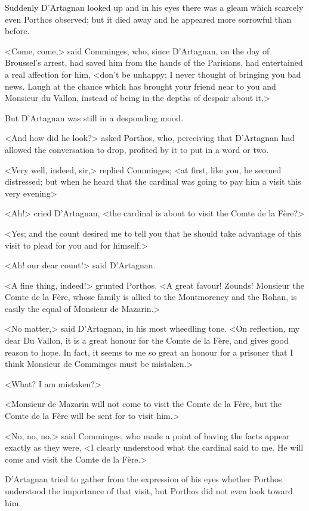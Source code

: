 Suddenly D'Artagnan looked up and in his eyes there was a gleam which scarcely even Porthos observed; but it died away and he appeared more sorrowful than before.

<Come, come,> said Comminges, who, since D'Artagnan, on the day of Broussel's arrest, had saved him from the hands of the Parisians, had entertained a real affection for him, <don't be unhappy; I never thought of bringing you bad news. Laugh at the chance which has brought your friend near to you and Monsieur du Vallon, instead of being in the depths of despair about it.>

But D'Artagnan was still in a desponding mood.

<And how did he look?> asked Porthos, who, perceiving that D'Artagnan had allowed the conversation to drop, profited by it to put in a word or two.

<Very well, indeed, sir,> replied Comminges; <at first, like you, he seemed distressed; but when he heard that the cardinal was going to pay him a visit this very evening\longdash>

<Ah!> cried D'Artagnan, <the cardinal is about to visit the Comte de la Fère?>

<Yes; and the count desired me to tell you that he should take advantage of this visit to plead for you and for himself.>

<Ah! our dear count!> said D'Artagnan.

<A fine thing, indeed!> grunted Porthos. <A great favour! Zounds! Monsieur the Comte de la Fère, whose family is allied to the Montmorency and the Rohan, is easily the equal of Monsieur de Mazarin.>

<No matter,> said D'Artagnan, in his most wheedling tone. <On reflection, my dear Du Vallon, it is a great honour for the Comte de la Fère, and gives good reason to hope. In fact, it seems to me so great an honour for a prisoner that I think Monsieur de Comminges must be mistaken.>

<What? I am mistaken?>

<Monsieur de Mazarin will not come to visit the Comte de la Fère, but the Comte de la Fère will be sent for to visit him.>

<No, no, no,> said Comminges, who made a point of having the facts appear exactly as they were, <I clearly understood what the cardinal said to me. He will come and visit the Comte de la Fère.>

D'Artagnan tried to gather from the expression of his eyes whether Porthos understood the importance of that visit, but Porthos did not even look toward him.

